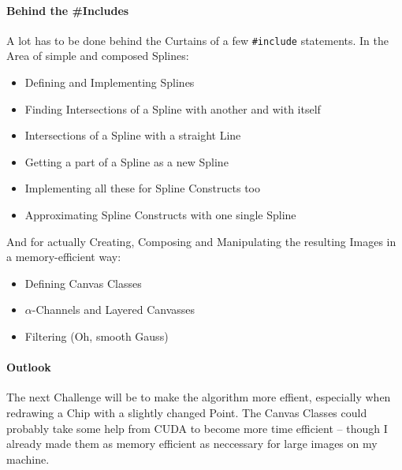 \documentclass[10pt]{article}
\begin{document}
\paragraph{Behind the \#Includes}
    A lot has to be done behind the Curtains of a few {\tt \#include} statements.
    In the Area of simple and composed Splines:
    \begin{itemize}
        \item Defining and Implementing Splines
        \item Finding Intersections of a Spline with another and with itself
        \item Intersections of a Spline with a straight Line
        \item Getting a part of a Spline as a new Spline
        \item Implementing all these for Spline Constructs too
        \item Approximating Spline Constructs with one single Spline
    \end{itemize}
    And for actually Creating, Composing and Manipulating the resulting Images in a memory-efficient way:
    \begin{itemize}
        \item Defining Canvas Classes
        \item $\alpha$-Channels and Layered Canvasses
        \item Filtering (Oh, smooth Gauss)
    \end{itemize}
\paragraph{Outlook}
    The next Challenge will be to make the algorithm more effient, especially when redrawing a Chip with a slightly changed Point.
    The Canvas Classes could probably take some help from CUDA to become more time efficient – though I already made them as memory efficient as neccessary for large images on my machine.

\if{}\fi
\end{document}
